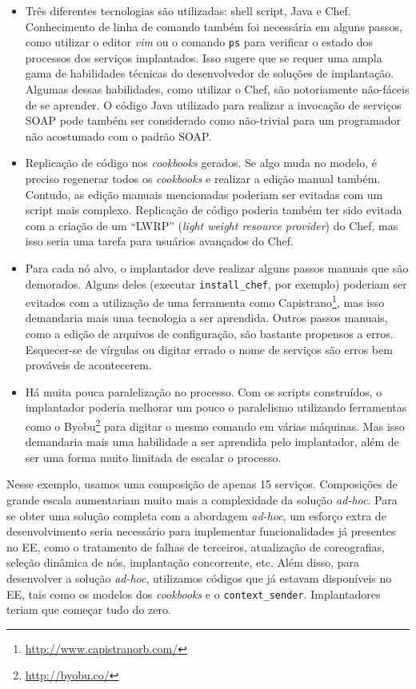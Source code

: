 \begin{itemize}

\item Três diferentes tecnologias são utilizadas:
shell script, Java e Chef.
Conhecimento de linha de comando também foi necessária em alguns passos,
como utilizar o editor \emph{vim} ou o comando \texttt{ps} para verificar
o estado dos processos dos serviços implantados.
Isso sugere que se requer uma ampla gama de habilidades técnicas
do desenvolvedor de soluções de implantação.
Algumas dessas habilidades, como utilizar o Chef,
são notoriamente não-fáceis de se aprender.
O código Java utilizado para realizar a invocação de serviços SOAP
pode também ser considerado como não-trivial para um programador
não acostumado com o padrão SOAP.

\item Replicação de código nos \emph{cookbooks} gerados.
Se algo muda no modelo, é preciso regenerar todos os \emph{cookbooks}
e realizar a edição manual também.
Contudo, as edição manuais mencionadas
poderiam ser evitadas com um script mais complexo.
Replicação de código poderia também ter sido evitada com a criação de um
``LWRP'' (\emph{light weight resource provider}) do Chef,
mas isso seria uma tarefa para usuários avançados do Chef.

\item Para cada nó alvo, o implantador deve realizar alguns passos manuais
que são demorados. Alguns deles (executar \texttt{install\_chef}, por exemplo)
poderiam ser evitados com a utilização de uma ferramenta como
Capistrano\footnote{\url{http://www.capistranorb.com/}},
mas isso demandaria mais uma tecnologia a ser aprendida.
Outros passos manuais, como a edição de arquivos de configuração, 
são bastante propensos a erros.
Esquecer-se de vírgulas ou digitar errado o nome de serviços
são erros bem prováveis de acontecerem.

\item Há muita pouca paralelização no processo.
Com os scripts construídos, o implantador poderia melhorar
um pouco o paralelismo utilizando ferramentas como o
Byobu\footnote{\url{http://byobu.co/}} 
para digitar o mesmo comando em várias máquinas.
Mas isso demandaria mais uma habilidade a ser aprendida pelo implantador,
além de ser uma forma muito limitada de escalar o processo.

\end{itemize}

Nesse exemplo, usamos uma composição de apenas 15 serviços.
Composições de grande escala aumentariam muito mais a complexidade da
solução \emph{ad-hoc}.
Para se obter uma solução completa com a abordagem \emph{ad-hoc},
um esforço extra de desenvolvimento seria necessário
para implementar funcionalidades já presentes no EE,
como o tratamento de falhas de terceiros,
atualização de coreografias, seleção dinâmica de nós,
implantação concorrente, etc.
Além disso, para desenvolver a solução \emph{ad-hoc},
utilizamos códigos que já estavam disponíveis no EE,
tais como os modelos dos \emph{cookbooks} e o \texttt{context\_sender}.
Implantadores teriam que começar tudo do zero.

